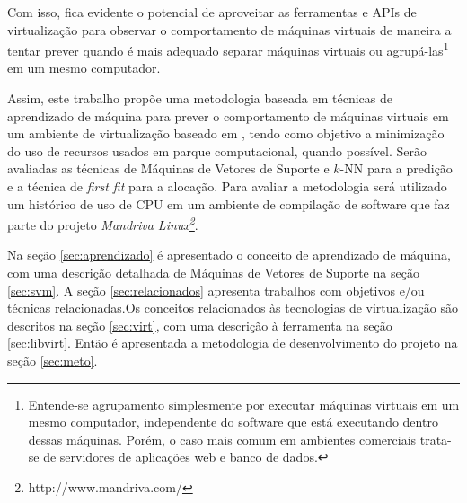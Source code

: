 Com isso, fica evidente o potencial de aproveitar as ferramentas e APIs de
virtualização para observar o comportamento de máquinas virtuais de maneira
a tentar prever quando é mais adequado separar máquinas virtuais ou
agrupá-las\footnote{Entende-se agrupamento simplesmente por
executar máquinas virtuais em um mesmo computador, independente do software
que está executando dentro dessas máquinas. Porém, o caso mais comum em
ambientes comerciais trata-se de servidores de aplicações web e banco de
dados.} em um mesmo computador. 

Assim, este trabalho propõe uma metodologia baseada em técnicas de
aprendizado de máquina para prever o comportamento de máquinas
virtuais em um ambiente de virtualização baseado em \libvirt{}, tendo como
objetivo a minimização do uso de recursos usados em parque computacional,
quando possível. Serão avaliadas as técnicas de Máquinas de Vetores de
Suporte e $k$-NN para a predição e a técnica de \emph{first fit} para a
alocação. Para avaliar a metodologia será utilizado um histórico de uso de
CPU em um ambiente de compilação de software que faz parte do projeto
\emph{Mandriva Linux\footnote{http://www.mandriva.com/}}.

Na seção \ref{sec:aprendizado} é apresentado o conceito de aprendizado de
máquina, com uma descrição detalhada de Máquinas de Vetores de Suporte na
seção \ref{sec:svm}. A seção \ref{sec:relacionados} apresenta trabalhos com
objetivos e/ou técnicas relacionadas.Os conceitos relacionados às tecnologias
de virtualização são descritos na seção \ref{sec:virt}, com uma descrição à
ferramenta \libvirt{} na seção \ref{sec:libvirt}. Então é apresentada a
metodologia de desenvolvimento do projeto na seção \ref{sec:meto}.
